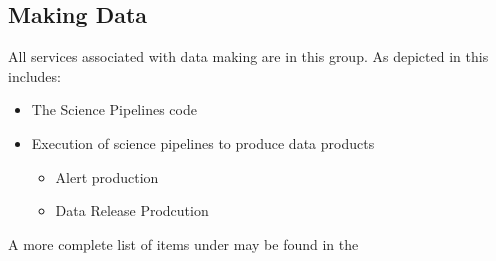 \subsection{Making Data} \label{sec:makingdata}

All services associated with data making are in this group.
As depicted in  this includes:

\begin{itemize}
\item The Science Pipelines code

\item Execution of science pipelines to produce data products
\begin{itemize}
\item Alert production
\item Data Release Prodcution
\end{itemize}
\end{itemize}

A more complete list of items under may be found in the 
